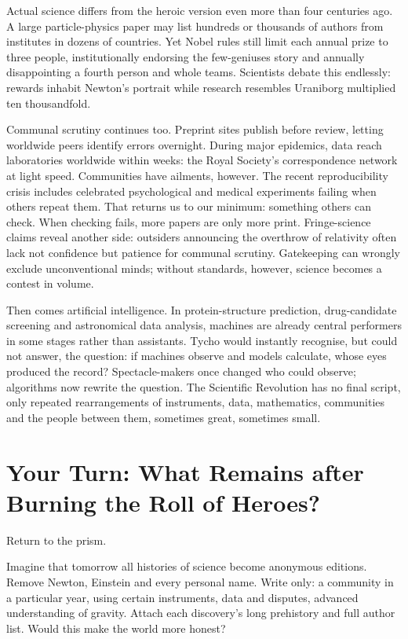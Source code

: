 Actual science differs from the heroic version even more than four centuries ago. A large particle-physics paper may list hundreds or thousands of authors from institutes in dozens of countries. Yet Nobel rules still limit each annual prize to three people, institutionally endorsing the few-geniuses story and annually disappointing a fourth person and whole teams. Scientists debate this endlessly: rewards inhabit Newton's portrait while research resembles Uraniborg multiplied ten thousandfold.

Communal scrutiny continues too. Preprint sites publish before review, letting worldwide peers identify errors overnight. During major epidemics, data reach laboratories worldwide within weeks: the Royal Society's correspondence network at light speed. Communities have ailments, however. The recent reproducibility crisis includes celebrated psychological and medical experiments failing when others repeat them. That returns us to our minimum: something others can check. When checking fails, more papers are only more print. Fringe-science claims reveal another side: outsiders announcing the overthrow of relativity often lack not confidence but patience for communal scrutiny. Gatekeeping can wrongly exclude unconventional minds; without standards, however, science becomes a contest in volume.

Then comes artificial intelligence. In protein-structure prediction, drug-candidate screening and astronomical data analysis, machines are already central performers in some stages rather than assistants. Tycho would instantly recognise, but could not answer, the question: if machines observe and models calculate, whose eyes produced the record? Spectacle-makers once changed who could observe; algorithms now rewrite the question. The Scientific Revolution has no final script, only repeated rearrangements of instruments, data, mathematics, communities and the people between them, sometimes great, sometimes small.

\section[Your Turn: Without the Heroes]{Your Turn: What Remains after Burning the Roll of Heroes?}
Return to the prism.

Imagine that tomorrow all histories of science become anonymous editions. Remove Newton, Einstein and every personal name. Write only: a community in a particular year, using certain instruments, data and disputes, advanced understanding of gravity. Attach each discovery's long prehistory and full author list. Would this make the world more honest?

